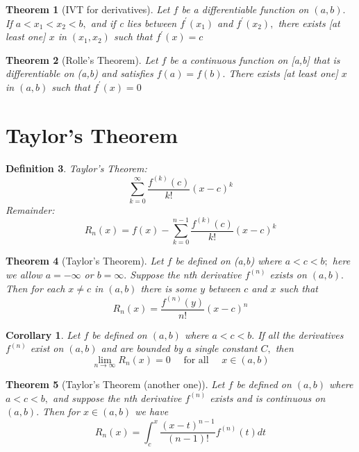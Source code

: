 \documentclass[12pt]{article}
\newtheorem{theorem}{Theorem}[section]
\newtheorem{corollary}{Corollary}[theorem]
\newtheorem{definition}[theorem]{Definition}
\begin{document}
\begin{theorem}[IVT for derivatives]
	Let $f$ be a differentiable function on $( a , b ) .$ If $a < x _ { 1 } < x _ { 2 } < b ,$ and
	if c lies between $f ^ { \prime } \left( x _ { 1 } \right)$ and $f ^ { \prime } \left( x _ { 2 } \right) ,$ there exists [at least one] $x$ in
	$\left( x _ { 1 } , x _ { 2 } \right)$ such that $f ^ { \prime } ( x ) = c$
\end{theorem}

\begin{theorem}[Rolle’s Theorem]
	Let $f$ be a continuous function on [a,b] that is differentiable on (a,b)
	and satisfies $f ( a ) = f ( b ) .$ There exists [at least one] $x$ in $( a , b )$ such
	that $f ^ { \prime } ( x ) = 0$
\end{theorem}

\section{Taylor's Theorem}
\begin{definition}
	Taylor's Theorem: $$
	\sum _ { k = 0 } ^ { \infty } \frac { f ^ { ( k ) } ( c ) } { k ! } ( x - c ) ^ { k }
	$$
	Remainder: $$
	R _ { n } ( x ) = f ( x ) - \sum _ { k = 0 } ^ { n - 1 } \frac { f ^ { ( k ) } ( c ) } { k ! } ( x - c ) ^ { k }
	$$
\end{definition}
\begin{theorem}[Taylor's Theorem]
	Let $f$ be defined on (a,b) where $a < c < b ;$ here we allow $a = - \infty$
	or $b = \infty .$ Suppose the nth derivative $f ^ { ( n ) }$ exists on $( a , b ) .$ Then for
	each $x \neq c$ in $( a , b )$ there is some $y$ between $c$ and $x$ such that $$
	R _ { n } ( x ) = \frac { f ^ { ( n ) } ( y ) } { n ! } ( x - c ) ^ { n }
	$$
\end{theorem}
\begin{corollary}
	Let $f$ be defined on $( a , b )$ where $a < c < b .$ If all the derivatives $f ^ { ( n ) }$
	exist on $( a , b )$ and are bounded by a single constant $C ,$ then
	$$
	\lim _ { n \rightarrow \infty } R _ { n } ( x ) = 0 \quad \text { for all } \quad x \in ( a , b )
	$$
\end{corollary}

\begin{theorem}[Taylor's Theorem (another one)]
	Let $f$ be defined on $( a , b )$ where $a < c < b ,$ and suppose the nth
	derivative $f ^ { ( n ) }$ exists and is continuous on $( a , b ) .$ Then for $x \in ( a , b )$ we have $$
	R _ { n } ( x ) = \int _ { c } ^ { x } \frac { ( x - t ) ^ { n - 1 } } { ( n - 1 ) ! } f ^ { ( n ) } ( t ) d t
	$$
\end{theorem}
\end{document}

